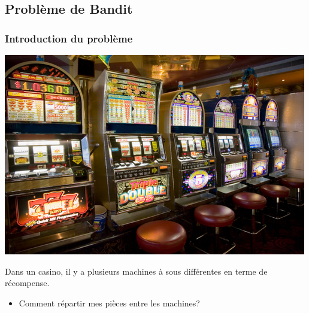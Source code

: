 \documentclass[compress, color = usenames, dvipsnames]{beamer}
\begin{document}
\subsection{Problème de Bandit}

\begin{frame}
    \frametitle{Introduction du problème}
    \begin{center}
        \includegraphics[scale=0.8]{figs/bandit_casino.jpg}
    \end{center}
    Dans un casino, il y a plusieurs machines à sous différentes en terme de récompense.
    \begin{itemize}
        \item Comment répartir mes pièces entre les machines?
    \end{itemize}
\end{frame}
\end{document}
